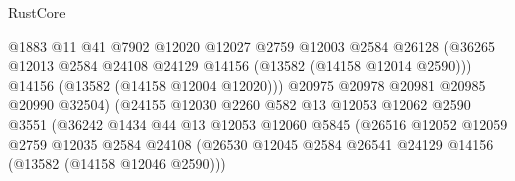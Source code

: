 \begin{lexlean}{RustCore}
\begin{coremodule}
                                        @1883
                                        @11
                                        @41
                                        @7902
                                        @12020
                                        @12027
                                        @2759
                                        @12003
                                        @2584
                                        @26128
                                        (@36265
                                          @12013
                                          @2584
                                          @24108
                                          @24129
                                          @14156
                                          (@13582 (@14158 @12014 @2590)))
                                        @14156
                                        (@13582 (@14158 @12004 @12020)))
                                      @20975
                                      @20978
                                      @20981
                                      @20985
                                      @20990
                                      @32504)
                                    (@24155
                                      @12030
                                      @2260
                                      @582
                                      @13
                                      @12053
                                      @12062
                                      @2590
                                      @3551
                                      (@36242
                                        @1434
                                        @44
                                        @13
                                        @12053
                                        @12060
                                        @5845
                                        (@26516
                                          @12052
                                          @12059
                                          @2759
                                          @12035
                                          @2584
                                          @24108
                                          (@26530
                                            @12045
                                            @2584
                                            @26541
                                            @24129
                                            @14156
                                            (@13582 (@14158 @12046 @2590)))

\end{coremodule}
\end{lexlean}
